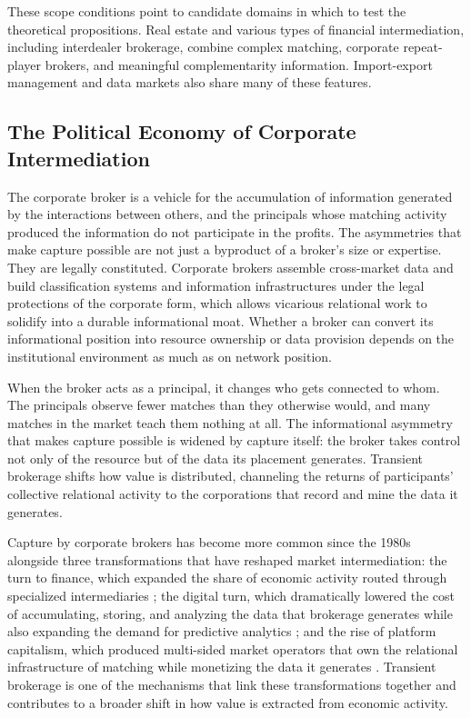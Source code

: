 \documentclass[
]{article}
\begin{document}
These scope conditions point to candidate domains in which to test the theoretical propositions. Real estate and various types of financial intermediation, including interdealer brokerage, combine complex matching, corporate repeat-player brokers, and meaningful complementarity information. Import-export management and data markets also share many of these features.

\subsection{The Political Economy of Corporate Intermediation}

The corporate broker is a vehicle for the accumulation of information generated by the interactions between others, and the principals whose matching activity produced the information do not participate in the profits. The asymmetries that make capture possible are not just a byproduct of a broker's size or expertise. They are legally constituted. Corporate brokers assemble cross-market data and build classification systems and information infrastructures under the legal protections of the corporate form, which allows vicarious relational work to solidify into a durable informational moat. Whether a broker can convert its informational position into resource ownership or data provision depends on the institutional environment as much as on network position.

When the broker acts as a principal, it changes who gets connected to whom. The principals observe fewer matches than they otherwise would, and many matches in the market teach them nothing at all. The informational asymmetry that makes capture possible is widened by capture itself: the broker takes control not only of the resource but of the data its placement generates. Transient brokerage shifts how value is distributed, channeling the returns of participants' collective relational activity to the corporations that record and mine the data it generates.

Capture by corporate brokers has become more common since the 1980s alongside three transformations that have reshaped market intermediation: the turn to finance, which expanded the share of economic activity routed through specialized intermediaries \autocite{carruthersFinancializationInstitutionalFoundations2015,krippnerCapitalizingCrisisPolitical2011}; the digital turn, which dramatically lowered the cost of accumulating, storing, and analyzing the data that brokerage generates while also expanding the demand for predictive analytics \autocite{cohenTruthPowerLegal2019,gandyPanopticSortPolitical1993}; and the rise of platform capitalism, which produced multi-sided market operators that own the relational infrastructure of matching while monetizing the data it generates \autocite{sadowskiInternetLandlordsDigital2020,viljoenDesignChoicesMechanism2021}. Transient brokerage is one of the mechanisms that link these transformations together and contributes to a broader shift in how value is extracted from economic activity.
\end{document}
